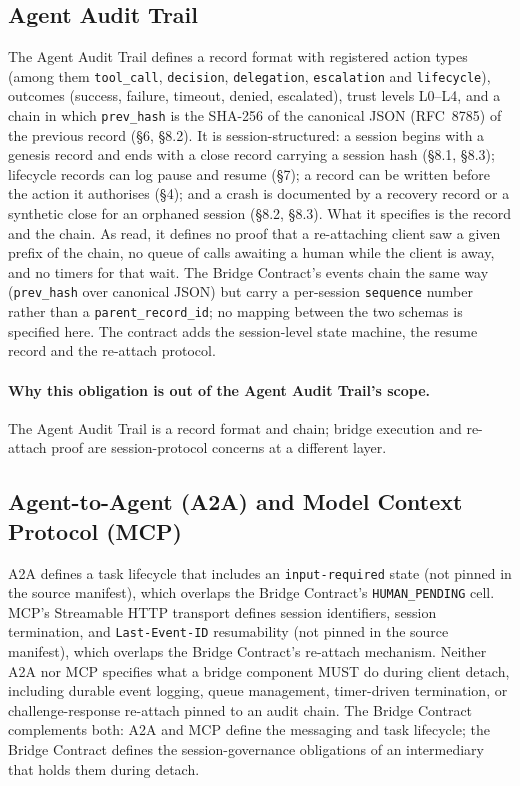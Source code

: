 \subsection{Agent Audit Trail}\label{sec:rw-audit-trail}

The Agent Audit Trail \cite{I-D.sharif-agent-audit-trail} defines a
record format with registered action types (among them \texttt{tool\_call},
\texttt{decision}, \texttt{delegation}, \texttt{escalation} and
\texttt{lifecycle}), outcomes (success, failure, timeout, denied,
escalated), trust levels L0--L4, and a chain in which \texttt{prev\_hash}
is the SHA-256 of the canonical JSON (RFC~8785) of the previous record
(\S 6, \S 8.2). It is session-structured: a session begins with a genesis
record and ends with a close record carrying a session hash (\S 8.1,
\S 8.3); lifecycle records can log pause and resume (\S 7); a record can be
written before the action it authorises (\S 4); and a crash is documented by
a recovery record or a synthetic close for an orphaned session
(\S 8.2, \S 8.3). What it specifies is the record and the chain. As read, it
defines no proof that a re-attaching client saw a given prefix of the chain,
no queue of calls awaiting a human while the client is away, and no timers
for that wait. The Bridge Contract's events chain the same way
(\texttt{prev\_hash} over canonical JSON) but carry a per-session
\texttt{sequence} number rather than a \texttt{parent\_record\_id}; no
mapping between the two schemas is specified here. The contract adds the
session-level state machine, the resume record and the re-attach protocol.

\paragraph{Why this obligation is out of the Agent Audit Trail's scope.}
The Agent Audit Trail is a record format and chain; bridge execution
and re-attach proof are session-protocol concerns at a different
layer.

\subsection{Agent-to-Agent (A2A) and Model Context Protocol (MCP)}

A2A defines a task lifecycle that includes an \texttt{input-required}
state (not pinned in the source manifest), which overlaps the Bridge Contract's \texttt{HUMAN\_PENDING}
cell. MCP's Streamable HTTP transport defines session identifiers,
session termination, and \texttt{Last-Event-ID} resumability (not
pinned in the source manifest), which
overlaps the Bridge Contract's re-attach mechanism. Neither A2A nor
MCP specifies what a bridge component MUST do during client detach,
including durable event logging, queue management, timer-driven
termination, or challenge-response re-attach pinned to an audit
chain. The Bridge Contract complements both: A2A and MCP define the
messaging and task lifecycle; the Bridge Contract defines the
session-governance obligations of an intermediary that holds them
during detach.


